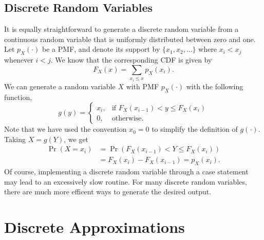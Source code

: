 \subsection{Discrete Random Variables}

It is equally straightforward to generate a discrete random variable from a continuous random variable that is uniformly distributed between zero and one.
Let $p_X(\cdot)$ be a PMF, and denote its support by $\{ x_1, x_2, \ldots \}$ where $x_i < x_j$ whenever $i < j$.
We know that the corresponding CDF is given by
\begin{equation*}
F_X(x) = \sum_{x_i \leq x} p_X (x_i) .
\end{equation*}
We can generate a random variable $X$ with PMF $p_X(\cdot)$ with the following function,
\begin{equation*}
g(y) = \begin{cases} x_i, & \text{if } F_X(x_{i-1}) < y \leq F_X (x_i) \\
0, & \text{otherwise}. \end{cases}
\end{equation*}
Note that we have used the convention $x_0 = 0$ to simplify the definition of $g(\cdot)$.
Taking $X = g(Y)$, we get
\begin{equation*}
\begin{split}
\Pr (X = x_i) &= \Pr ( F_X(x_{i-1}) < Y \leq F_X (x_i) ) \\
&= F_X (x_i) - F_X (x_{i-1}) = p_X (x_i) .
\end{split}
\end{equation*}
Of course, implementing a discrete random variable through a case statement may lead to an excessively slow routine.
For many discrete random variables, there are much more efficent ways to generate the desired output.


\section{Discrete Approximations}

